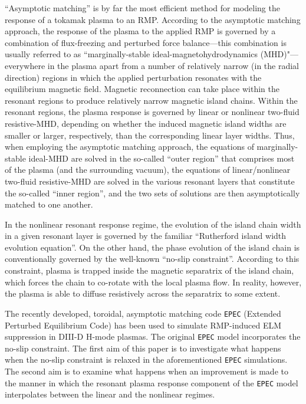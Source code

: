 \documentclass[12pt,prb,aps]{revtex4-1}
\begin{document}
``Asymptotic matching'' is by far the most efficient method for modeling the response of a tokamak plasma to an RMP.\cite{fkr,coppi,ruth,ara,pletz,rfa, am1,tokuda,brennan,am2,am3} 
According to the asymptotic matching approach, the response of the plasma to the applied RMP is governed by a combination of flux-freezing and
perturbed force balance---this combination is usually referred to as ``marginally-stable ideal-magnetohydrodynamics (MHD)"---everywhere in the plasma apart from a number of relatively narrow (in the radial direction) regions in which the applied
perturbation resonates with the equilibrium magnetic field. Magnetic reconnection can take place within the resonant regions to
produce relatively narrow magnetic island chains. Within the resonant regions, the plasma response is governed by  linear or nonlinear 
 two-fluid resistive-MHD, depending on whether the induced magnetic island widths are smaller or larger, respectively, than the corresponding linear layer widths. 
 Thus, when employing the asymptotic matching approach, the equations of marginally-stable ideal-MHD
are solved in the so-called ``outer region'' that comprises most of the plasma (and the surrounding vacuum), the equations of 
linear/nonlinear two-fluid resistive-MHD are solved in the various resonant layers that constitute the so-called ``inner region'', and the two
sets of solutions are then asymptotically matched to one another. 

In the nonlinear resonant response regime, the evolution of the island chain width in a given resonant layer is governed by the familiar ``Rutherford island width evolution equation''.\cite{ruth,ruth1}
On the other hand, the phase evolution of the island chain is conventionally governed by the well-known ``no-slip constraint''.\cite{rfa} According to this constraint,  plasma is trapped inside the
magnetic separatrix of the island chain,
which forces the chain to co-rotate with the local plasma flow. In reality, however, the plasma
is able to diffuse resistively across the separatrix to some extent.\cite{slip1,slip2} 

The recently developed, toroidal, asymptotic matching code {\tt EPEC} (Extended Perturbed Equilibrium Code) has been used to simulate 
RMP-induced ELM suppression in DIII-D H-mode plasmas.\cite{rftor,rftor1}
The original {\tt EPEC} model incorporates the no-slip constraint.
The first aim of this paper is to investigate 
what happens when the no-slip constraint is relaxed in the aforementioned {\tt EPEC} simulations.
 The second aim is to examine what happens when an improvement is made to the manner in which the resonant
plasma response component of the {\tt EPEC} model interpolates between the linear and the nonlinear regimes. 
\end{document}
